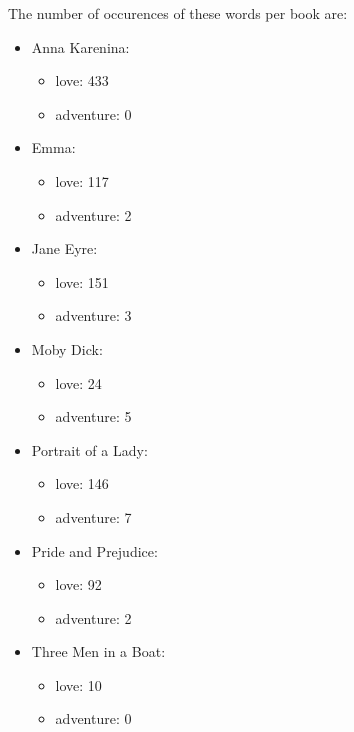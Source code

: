 \documentclass[a4paper,11pt,oneside]{book}
\begin{document}
\begin{enumerate}
\begin{enumerate}
								The number of occurences of these words per book are:
								\begin{itemize}
									\item Anna Karenina:
												\begin{itemize}
													\item{love:	433}
													\item{adventure:	0}
												\end{itemize}
									\item Emma:
												\begin{itemize}
													\item{love:	117}
													\item{adventure:	2}
												\end{itemize}
									\item Jane Eyre:
												\begin{itemize}
													\item{love:	151}
													\item{adventure:	3}
												\end{itemize}
									\item Moby Dick:
												\begin{itemize}
													\item{love:	24}
													\item{adventure:	5}
												\end{itemize}
									\item Portrait of a Lady:
												\begin{itemize}
													\item{love:	146}
													\item{adventure:	7}
												\end{itemize}
									\item Pride and Prejudice:
												\begin{itemize}
													\item{love:	92}
													\item{adventure:	2}
												\end{itemize}
									\item Three Men in a Boat:
												\begin{itemize}
													\item{love:	10}
													\item{adventure:	0}
												\end{itemize}
								\end{itemize}

\end{enumerate}
\end{enumerate}
\end{document}

